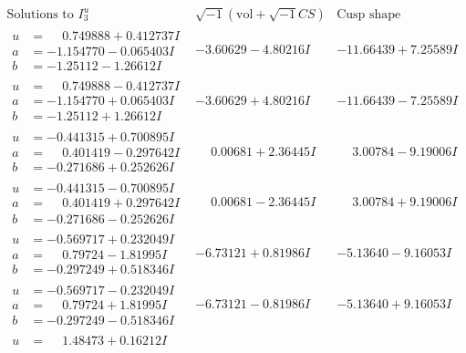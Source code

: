\documentclass[1p]{elsarticle_modified}
\theoremstyle{definition}
\newcommand{\I}{\sqrt{-1}}
\begin{document}
$$\begin{array}{c|c|c}  
\text{Solutions to }I^u_{3}& \I (\text{vol} + \sqrt{-1}CS) & \text{Cusp shape}\\
 \hline 
\begin{aligned}
u &= \phantom{-}0.749888 + 0.412737 I \\
a &= -1.154770 - 0.065403 I \\
b &= -1.25112 - 1.26612 I\end{aligned}
 & -3.60629 - 4.80216 I & -11.66439 + 7.25589 I \\ \hline\begin{aligned}
u &= \phantom{-}0.749888 - 0.412737 I \\
a &= -1.154770 + 0.065403 I \\
b &= -1.25112 + 1.26612 I\end{aligned}
 & -3.60629 + 4.80216 I & -11.66439 - 7.25589 I \\ \hline\begin{aligned}
u &= -0.441315 + 0.700895 I \\
a &= \phantom{-}0.401419 - 0.297642 I \\
b &= -0.271686 + 0.252626 I\end{aligned}
 & \phantom{-}0.00681 + 2.36445 I & \phantom{-}3.00784 - 9.19006 I \\ \hline\begin{aligned}
u &= -0.441315 - 0.700895 I \\
a &= \phantom{-}0.401419 + 0.297642 I \\
b &= -0.271686 - 0.252626 I\end{aligned}
 & \phantom{-}0.00681 - 2.36445 I & \phantom{-}3.00784 + 9.19006 I \\ \hline\begin{aligned}
u &= -0.569717 + 0.232049 I \\
a &= \phantom{-}0.79724 - 1.81995 I \\
b &= -0.297249 + 0.518346 I\end{aligned}
 & -6.73121 + 0.81986 I & -5.13640 - 9.16053 I \\ \hline\begin{aligned}
u &= -0.569717 - 0.232049 I \\
a &= \phantom{-}0.79724 + 1.81995 I \\
b &= -0.297249 - 0.518346 I\end{aligned}
 & -6.73121 - 0.81986 I & -5.13640 + 9.16053 I \\ \hline\begin{aligned}
u &= \phantom{-}1.48473 + 0.16212 I \\

\end{aligned}
\end{array}$$
\end{document}
